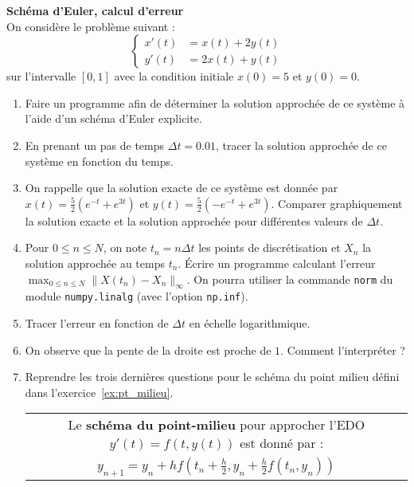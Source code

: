 \documentclass[12pt]{article}
\begin{document}
\begin{exo}
  \label{ex:sch_exp}
  \textbf{Sch\'ema d'Euler, calcul d'erreur} \\
On consid\`ere le probl\`eme suivant :
$$
\left\{
\begin{array}{rl}
x'(t)&=x(t)+2y(t)\\
y'(t)&=2x(t)+y(t)
\end{array}
\right.
$$
sur l'intervalle $[0,1]$ avec la condition initiale $x(0)=5$ et $y(0)=0$.
\begin{enumerate}
\item Faire un programme afin de d\'eterminer la solution approch\'ee de ce syst\`eme \`a l'aide d'un sch\'ema d'Euler explicite. 
\item En prenant un pas de temps $\Delta t = 0.01$, tracer la solution approch\'ee de ce syst\`eme en fonction du temps.
\item On rappelle que la solution exacte de ce syst\`eme est donn\'ee par
  $x(t) = \frac52 (e^{-t} + e^{3t})$ et $y(t) = \frac52 (-e^{-t} + e^{3t})$. Comparer graphiquement la solution exacte et la solution approch\'ee pour diff\'erentes valeurs de $\Delta t$.
\item Pour $0\leq n \leq N$, on note $t_n=n\Delta t$ les points de discr\'etisation et $X_n$ la solution approch\'ee au temps $t_n$. \'Ecrire un programme
  calculant l'erreur $\max_{0\leq n \leq N}\|X(t_n)-X_n\|_{\infty}$. On pourra utiliser la commande \texttt{norm} du module \texttt{numpy.linalg} (avec l'option \texttt{np.inf}). 
\item Tracer  l'erreur en fonction de $\Delta t$ en \'echelle logarithmique. 
\item On observe que la pente de la droite est proche de $1$. Comment l'interpr\'eter ?
\item Reprendre les trois derni\`eres questions
  pour le sch\'ema du point milieu d\'efini dans l'exercice~\ref{ex:pt_milieu}.
\begin{tabular}{|c|}
 \hline
Le \textbf{sch\'ema du point-milieu} pour approcher l'EDO $y'(t)=f(t,y(t))$ est donn\'e par :\\
$y_{n+1}=y_n+h f\displaystyle\left(t_n+\frac h2,y_n+\frac h2 f(t_n,y_n)\right)$\\
 \hline
\end{tabular}
 \vspace{0.2cm}
\end{enumerate}
\end{exo}
\newpage
\end{document}
